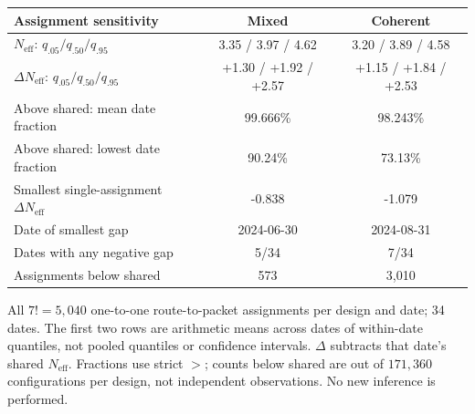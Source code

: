 \footnotesize
\begin{tabular*}{\linewidth}{@{\extracolsep{\fill}}lcc}
\toprule
Assignment sensitivity & Mixed & Coherent \\
\midrule
$N_{\mathrm{eff}}$: $q_{.05}/q_{.50}/q_{.95}$ & 3.35 / 3.97 / 4.62 & 3.20 / 3.89 / 4.58 \\
$\Delta N_{\mathrm{eff}}$: $q_{.05}/q_{.50}/q_{.95}$ & +1.30 / +1.92 / +2.57 & +1.15 / +1.84 / +2.53 \\
Above shared: mean date fraction & 99.666\% & 98.243\% \\
Above shared: lowest date fraction & 90.24\% & 73.13\% \\
Smallest single-assignment $\Delta N_{\mathrm{eff}}$ & -0.838 & -1.079 \\
Date of smallest gap & 2024-06-30 & 2024-08-31 \\
Dates with any negative gap & 5/34 & 7/34 \\
Assignments below shared & 573 & 3,010 \\
\bottomrule
\end{tabular*}
\par\vspace{2pt}\begingroup\scriptsize
All $7!=5{,}040$ one-to-one route-to-packet assignments per design and date; 34 dates. The first two rows are arithmetic means across dates of within-date quantiles, not pooled quantiles or confidence intervals. $\Delta$ subtracts that date's shared $N_{\mathrm{eff}}$. Fractions use strict $>$; counts below shared are out of $171{,}360$ configurations per design, not independent observations. No new inference is performed.\par\endgroup
